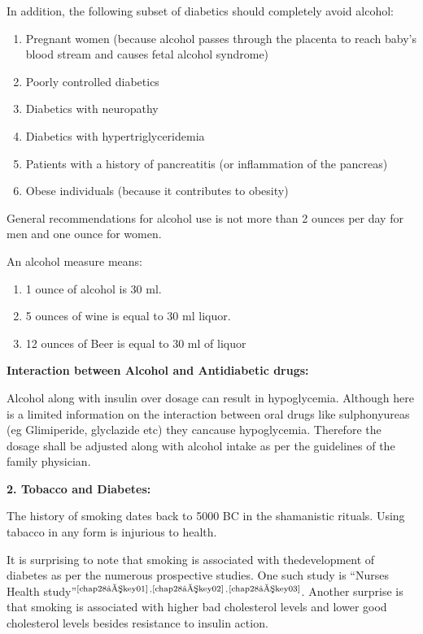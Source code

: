 In addition, the following subset of diabetics should completely avoid alcohol:

\vspace{-\topsep}
\begin{enumerate}[•]
\itemsep=0pt
\item Pregnant women (because alcohol passes through the placenta to reach baby’s blood stream and causes fetal alcohol syndrome)
\item Poorly controlled diabetics
\item Diabetics with neuropathy
\item Diabetics with hypertriglyceridemia
\item Patients with a history of pancreatitis (or inflammation of the pancreas)
\item Obese individuals (because it contributes to obesity)
\end{enumerate}
\vspace{-\topsep}

General recommendations for alcohol use is not more than 2 ounces per day for men and one ounce for women.

\noindent An alcohol measure means:

\vspace{-\topsep}
\begin{enumerate}[•]
\itemsep=0pt
\item 1 ounce of alcohol is 30 ml.
\item 5 ounces of wine is equal to 30 ml liquor.
\item 12 ounces of Beer is equal to 30 ml of liquor
\end{enumerate}
\vspace{-\topsep}

\noindent\textbf{Interaction between Alcohol and Antidiabetic drugs:}

Alcohol along with insulin over dosage can result in hypoglycemia. Although here is a limited information on the interaction between oral drugs like sulphonyureas (eg Glimiperide, glyclazide etc) they can\break cause hypoglycemia. Therefore the dosage shall be adjusted along with alcohol intake as per the guidelines of the family physician.

{\noindent\Large\textbf{2. Tobacco and Diabetes:}}

The history of smoking dates back to 5000 BC in the shamanistic rituals. Using tabacco in any form is injurious to health.

It is surprising to note that smoking is associated with the\break development of diabetes as per the numerous prospective studies. One such study is “Nurses Health study”$^{\text{\cite{chap28–key01}}}$$^,$$^{\text{\cite{chap28–key02}}}$$^,$$^{\text{\cite{chap28–key03}}}$. Another surprise is that smoking is associated with higher bad cholesterol levels and lower good cholesterol levels besides resistance to insulin action.

